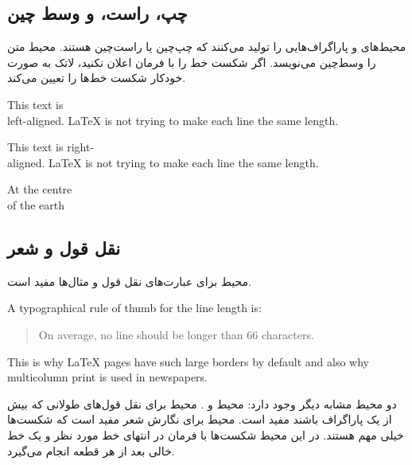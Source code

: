 \subsection{چپ، راست، و وسط چین}
محیط‌های
و 
پاراگراف‌هایی را تولید می‌کنند که چپ‌چین یا راست‌\-چین هستند. 
محیط 
متن را وسط‌چین می‌نویسد. اگر شکست خط را با فرمان  
\ci{\bs} 
اعلان نکنید، لاتک به صورت خودکار شکست خط‌ها را تعیین می‌کند.


\begin{example}
\begin{flushleft}
This text is\\ left-aligned. 
\LaTeX{} is not trying to make 
each line the same length.
\end{flushleft}
\end{example}

\begin{example}
\begin{flushright}
This text is right-\\aligned. 
\LaTeX{} is not trying to make
each line the same length.
\end{flushright}
\end{example}

\begin{example}
\begin{center}
At the centre\\of the earth
\end{center}
\end{example}


\subsection{نقل قول و شعر}
محیط 
برای عبارت‌های نقل‌ قول و مثال‌ها مفید است.

\begin{example}
A typographical rule of thumb
for the line length is:
\begin{quote}
On average, no line should
be longer than 66 characters.
\end{quote}
This is why \LaTeX{} pages have 
such large borders by default
and also why multicolumn print
is used in newspapers.
\end{example}
دو محیط مشابه دیگر وجود دارد: محیط
و 
.
محیط 
برای نقل‌ قول‌های طولانی که بیش از یک پاراگراف باشند مفید است. محیط 
برای نگارش شعر مفید است که شکست‌ها خیلی مهم هستند. در این محیط شکست‌ها با فرمان 
\ci{\bs}
در انتهای خط مورد نظر و یک خط خالی بعد از هر قطعه انجام می‌گیرد.



